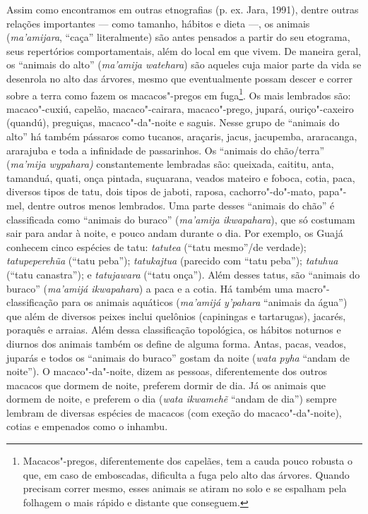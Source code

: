 Assim como encontramos em outras etnografias (p. ex. Jara, 1991), dentre
outras relações importantes --- como tamanho, hábitos e dieta ---, os
animais (\emph{ma'amijara}, ``caça'' literalmente) são antes pensados a partir do seu etograma, seus repertórios comportamentais, além do local em que vivem. De maneira geral, os ``animais do alto''
(\emph{ma'amija watehara}) são aqueles cuja maior parte da vida se
desenrola no alto das árvores, mesmo que eventualmente possam descer e
correr sobre a terra como fazem os macacos"-pregos em fuga\footnote{Macacos"-pregos,
  diferentemente dos capelães, tem a cauda pouco robusta o que, em caso
  de emboscadas, dificulta a fuga pelo alto das árvores. Quando precisam
  correr mesmo, esses animais se atiram no solo e se espalham pela
  folhagem o mais rápido e distante que conseguem.}. Os mais lembrados
são: macaco"-cuxiú, capelão, macaco"-cairara, macaco"-prego, jupará,
ouriço"-caxeiro (quandú), preguiças, macaco"-da"-noite e saguis. Nesse
grupo de ``animais do alto'' há também pássaros como tucanos, araçaris,
jacus, jacupemba, araracanga, ararajuba e toda a infinidade de
passarinhos. Os ``animais do chão/terra'' (\emph{ma'mija wypahara)}
constantemente lembradas são: queixada, caititu, anta, tamanduá, quati,
onça pintada, suçuarana, veados mateiro e foboca, cotia, paca, diversos
tipos de tatu, dois tipos de jaboti, raposa, cachorro"-do"-mato, papa"-mel,
dentre outros menos lembrados. Uma parte desses ``animais do chão'' é
classificada como ``animais do buraco'' (\emph{ma'amija ikwapahara}),
que só costumam sair para andar à noite, e pouco andam durante o dia.
Por exemplo, os Guajá conhecem cinco espécies de tatu: \emph{tatutea}
(``tatu mesmo''/de verdade); \emph{tatupeperehũa} (``tatu peba'');
\emph{tatukajtua} (parecido com ``tatu peba''); \emph{tatuhua} (``tatu
canastra''); e \emph{tatujawara} (``tatu onça''). Além desses tatus, são
``animais do buraco'' (\emph{ma'amijá ikwapahara}) a paca e a cotia. Há
também uma macro"-classificação para os animais aquáticos (\emph{ma'amijá
y'pahara} ``animais da água'') que além de diversos peixes inclui
quelônios (capiningas e tartarugas), jacarés, poraquês e arraias. Além
dessa classificação topológica, os hábitos noturnos e diurnos dos
animais também os define de alguma forma. Antas, pacas, veados, juparás
e todos os ``animais do buraco'' gostam da noite (\emph{wata}
\emph{pyha} ``andam de noite''). O macaco"-da"-noite, dizem as pessoas,
diferentemente dos outros macacos que dormem de noite, preferem dormir
de dia. Já os animais que dormem de noite, e preferem o dia (\emph{wata
ikwamehẽ} ``andam de dia'') sempre lembram de diversas espécies de
macacos (com exeção do macaco"-da"-noite), cotias e empenados como o
inhambu.

